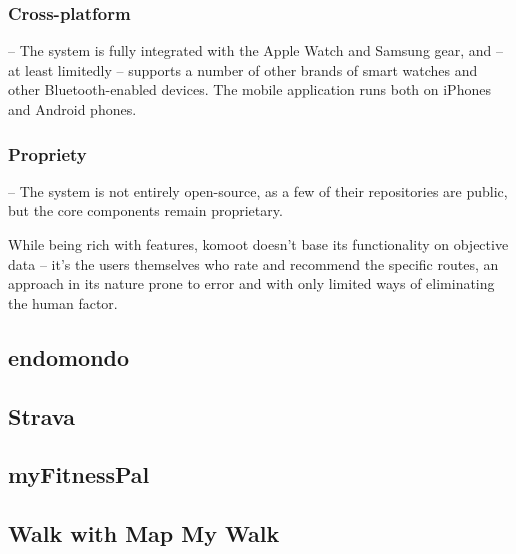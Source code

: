 \subsubsection{Cross-platform} -- The system is fully integrated with the Apple Watch and Samsung gear, and -- at least limitedly -- supports a number of other brands of smart watches and other Bluetooth-enabled devices.
The mobile application runs both on iPhones and Android phones.
\subsubsection{Propriety} -- The system is not entirely open-source, as a few of their repositories are public, but the core components remain proprietary. 


While being rich with features, komoot doesn't base its functionality on objective data -- it's the users themselves who rate and recommend the specific routes,
an approach in its nature prone to error and with only limited ways of eliminating the human factor.

\subsection{endomondo}

\subsection{Strava}

\subsection{myFitnessPal}

\subsection{Walk with Map My Walk}